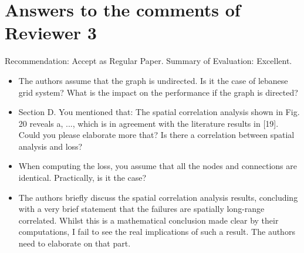 \section{Answers to the comments of Reviewer 3}
%
%

Recommendation: Accept as Regular Paper. Summary of Evaluation: Excellent. 

\begin{itemize}
\item The authors assume that the graph is undirected. Is it the case of lebanese grid system? What is the impact on the performance if the graph is directed? 

\item Section D. You mentioned that:  The spatial correlation analysis shown in Fig. 20 reveals a, ..., which is in agreement with the literature results
in [19]. Could you please elaborate more that? Is there a correlation between spatial analysis and loss?   

\item When computing the loss, you assume that all the nodes and connections are identical. Practically, is it the case? 

\item The authors briefly discuss the spatial correlation analysis results, concluding with a very brief statement that the failures are spatially long-range correlated. Whilst this is a mathematical conclusion made clear by their computations, I fail to see the real implications of such a result. The authors need to elaborate on that part.
\end{itemize}

